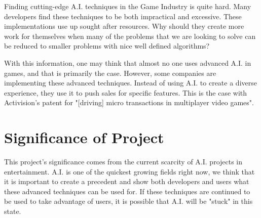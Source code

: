Finding cutting-edge A.I. techniques in the Game Industry is quite hard. Many developers find these techniques to be both impractical and excessive. These implementations use up sought after resources. Why should they create more work for themselves when many of the problems that we are looking to solve can be reduced to smaller problems with nice well defined algorithms?

With this information, one may think that almost no one uses advanced A.I. in games,
and that is primarily the case. However, some companies are implementing these advanced techniques. Instead of using A.I. to create a diverse experience, they use it to push sales for specific features. This is the case with Activision's patent for "[driving] micro transactions in multiplayer video games".



\section{Significance of Project} 

This project's significance comes from the current scarcity of A.I. projects in entertainment. A.I. is one of the quickest growing fields right now, we think that it is important to create a precedent and show both developers and users what these advanced techniques can be used for. If these techniques are continued to be used to take advantage of users, it is possible that A.I. will be "stuck" in this state.

